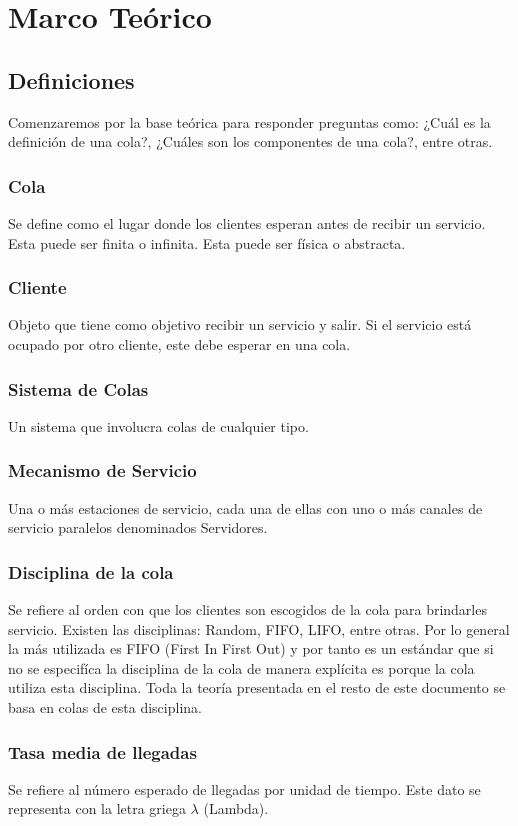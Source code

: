 \documentclass{article}
\begin{document}
\section{Marco Teórico}
\subsection{Definiciones}
Comenzaremos por la base teórica para responder preguntas como: 
¿Cuál es la definición de una cola?, ¿Cuáles son los componentes de una cola?, 
entre otras.
\subsubsection{Cola}
Se define como el lugar donde los clientes esperan antes de recibir un servicio.
Esta puede ser finita o infinita. Esta puede ser física o abstracta.
\subsubsection{Cliente}
Objeto que tiene como objetivo recibir un servicio y salir. Si el servicio 
está ocupado por otro cliente, este debe esperar en una cola.
\subsubsection{Sistema de Colas}
Un sistema que involucra colas de cualquier tipo.
\subsubsection{Mecanismo de Servicio}
Una o más estaciones de servicio, cada una de ellas con uno o más 
canales de servicio paralelos denominados Servidores.
\subsubsection{Disciplina de la cola}
Se refiere al orden con que los clientes son escogidos de la cola
para brindarles servicio. Existen las disciplinas: Random, FIFO, LIFO, entre otras.
Por lo general la más utilizada es FIFO (First In First Out) y por tanto 
es un estándar que si no se especifíca la disciplina de la cola de manera
explícita es porque la cola utiliza esta disciplina. Toda la teoría presentada
en el resto de este documento se basa en colas de esta disciplina.
\subsubsection{Tasa media de llegadas}
Se refiere al número esperado de llegadas por unidad de tiempo. Este dato
se representa con la letra griega $\lambda$ (Lambda).
\end{document}
